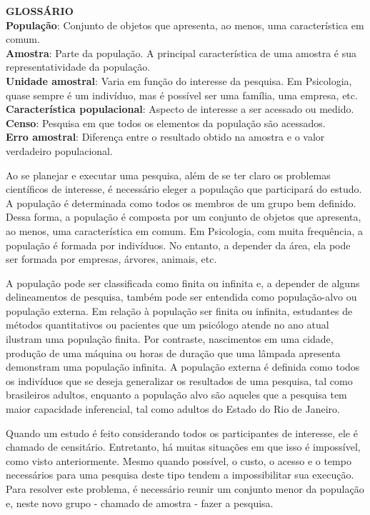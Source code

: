 \documentclass[
]{book}
\begin{document}
\textbf{GLOSSÁRIO}\\
\textbf{População}: Conjunto de objetos que apresenta, ao menos, uma característica em comum.\\
\textbf{Amostra}: Parte da população. A principal característica de uma amostra é sua representatividade da população.\\
\textbf{Unidade amostral}: Varia em função do interesse da pesquisa. Em Psicologia, quase sempre é um indivíduo, mas é possível ser uma família, uma empresa, etc.\\
\textbf{Característica populacional}: Aspecto de interesse a ser acessado ou medido.\\
\textbf{Censo}: Pesquisa em que todos os elementos da população são acessados.\\
\textbf{Erro amostral}: Diferença entre o resultado obtido na amostra e o valor verdadeiro populacional.

Ao se planejar e executar uma pesquisa, além de se ter claro os problemas científicos de interesse, é necessário eleger a população que participará do estudo. A população é determinada como todos os membros de um grupo bem definido. Dessa forma, a população é composta por um conjunto de objetos que apresenta, ao menos, uma característica em comum. Em Psicologia, com muita frequência, a população é formada por indivíduos. No entanto, a depender da área, ela pode ser formada por empresas, árvores, animais, etc.

A população pode ser classificada como finita ou infinita e, a depender de alguns delineamentos de pesquisa, também pode ser entendida como população-alvo ou população externa. Em relação à população ser finita ou infinita, estudantes de métodos quantitativos ou pacientes que um psicólogo atende no ano atual ilustram uma população finita. Por contraste, nascimentos em uma cidade, produção de uma máquina ou horas de duração que uma lâmpada apresenta demonstram uma população infinita. A população externa é definida como todos os indivíduos que se deseja generalizar os resultados de uma pesquisa, tal como brasileiros adultos, enquanto a população alvo são aqueles que a pesquisa tem maior capacidade inferencial, tal como adultos do Estado do Rio de Janeiro.

Quando um estudo é feito considerando todos os participantes de interesse, ele é chamado de censitário. Entretanto, há muitas situações em que isso é impossível, como visto anteriormente. Mesmo quando possível, o custo, o acesso e o tempo necessários para uma pesquisa deste tipo tendem a impossibilitar sua execução. Para resolver este problema, é necessário reunir um conjunto menor da população e, neste novo grupo - chamado de amostra - fazer a pesquisa.
\end{document}
